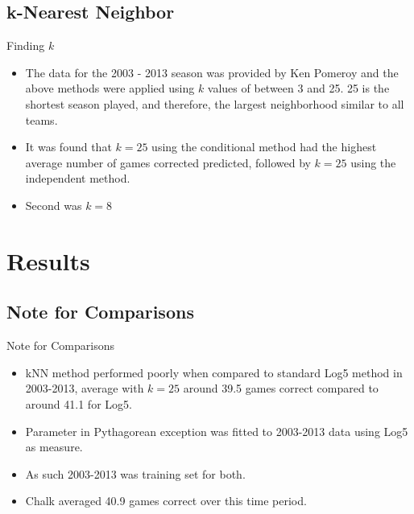 \documentclass{beamer}
\begin{document}
\subsection{k-Nearest Neighbor}

\begin{frame}{Finding $k$}
\begin{itemize}
\item The data for the 2003 - 2013 season was provided by Ken Pomeroy and the above methods were applied using $k$ values of between 3 and 25. 25 is the shortest season played, and therefore, the largest neighborhood similar to all teams.
\item It was found that $k=25$ using the conditional method had the highest average number of games corrected predicted, followed by $k=25$ using the independent method. 
\item Second was $k=8$

\end{itemize}



\end{frame}
\section{Results}

\subsection{Note for Comparisons}

\begin{frame}{Note for Comparisons}
\begin{itemize}
\item kNN method performed poorly when compared to standard Log5 method in 2003-2013, average with $k=25$ around 39.5 games correct compared to around 41.1 for Log5. 
\item Parameter in Pythagorean exception was fitted to 2003-2013 data using Log5 as measure.
\item As such 2003-2013 was training set for both.
\item Chalk averaged 40.9 games correct over this time period.

\end{itemize}



\end{frame}
\end{document}
